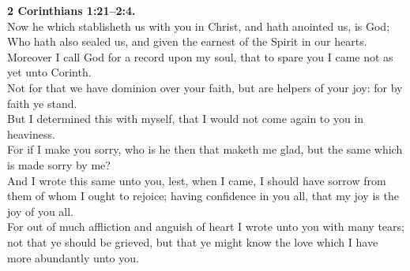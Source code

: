 \documentclass[10pt]{article} %
\begin{document}
{\begin{minipage}[t]{0.45\textwidth}
\textbf{2 Corinthians 1:21--2:4.}\\
Now he which stablisheth us with you in Christ, and hath anointed us, is God;\\
Who hath also sealed us, and given the earnest of the Spirit in our hearts.\\
Moreover I call God for a record upon my soul, that to spare you I came not as yet unto Corinth.\\
Not for that we have dominion over your faith, but are helpers of your joy: for by faith ye stand.\\
But I determined this with myself, that I would not come again to you in heaviness.\\
For if I make you sorry, who is he then that maketh me glad, but the same which is made sorry by me?\\
And I wrote this same unto you, lest, when I came, I should have sorrow from them of whom I ought to rejoice; having confidence in you all, that my joy is the joy of you all.\\
For out of much affliction and anguish of heart I wrote unto you with many tears; not that ye should be grieved, but that ye might know the love which I have more abundantly unto you.\\

\end{minipage}}
\vspace*{\fill}
\newpage
\Huge%
\vspace*{\fill}
\begin{spacing}{1.3}%
\end{spacing}
\vspace*{\fill}
\end{document}
